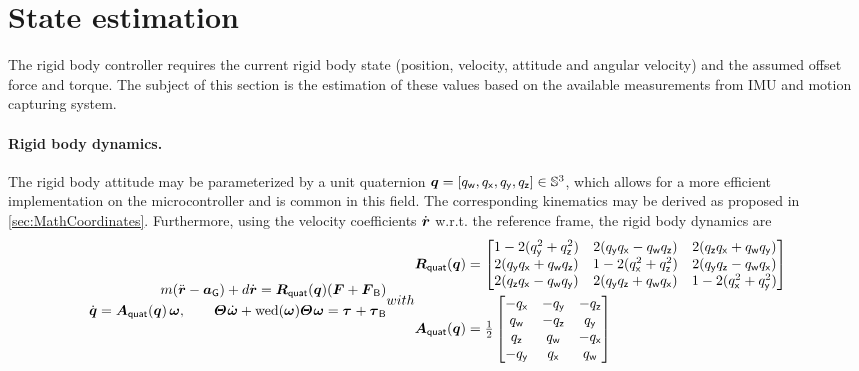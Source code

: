 \section{State estimation}\label{sec:RealizationStateEstimation}
The rigid body controller requires the current rigid body state (position, velocity, attitude and angular velocity) and the assumed offset force and torque.
The subject of this section is the estimation of these values based on the available measurements from IMU and motion capturing system.

\paragraph{Rigid body dynamics.}
The rigid body attitude may be parameterized by a unit quaternion $\boldsymbol{q} = [q_{\mathsf{w}}, q_{\mathsf{x}}, q_{\mathsf{y}}, q_{\mathsf{z}}] \in \mathbb{S}^3$, which allows for a more efficient implementation on the microcontroller and is common in this field.
The corresponding kinematics may be derived as proposed in \autoref{sec:MathCoordinates}.
Furthermore, using the velocity coefficients $\dot{\boldsymbol{r}}$ w.r.t. the reference frame, the rigid body dynamics are
\begin{subequations}\label{eq:RealizationStateDyn}
\begin{align}
 m (\rdd - \gravityAcc) + d \rd = \RotMatQuat(\quat) (\F + \FB)
\\
 \quatd = \kinMatQuat(\quat) \, \w, \qquad
 \bodyMOI{}{} \dot{\w} + \wedOp(\w) \bodyMOI{}{} \w = \bodyTorque{}{} + \tauB
\end{align}
with
\begin{align}
 \RotMatQuat(\quat) &=
 \begin{bmatrix} 
  1 - 2(\quaty^{2} + \quatz^{2}) & 2(\quaty\quatx -\quatw\quatz)  & 2(\quatz\quatx + \quatw\quaty) \\
  2(\quaty\quatx + \quatw\quatz) & 1 - 2(\quatx^{2} + \quatz^{2}) & 2(\quaty\quatz - \quatw\quatx) \\
  2(\quatz\quatx - \quatw\quaty) & 2(\quaty\quatz + \quatw\quatx) & 1 - 2(\quatx^{2} + \quaty^{2})
 \end{bmatrix}
\\
 \kinMatQuat(\quat) &=
 \tfrac{1}{2} \begin{bmatrix}
  -\quatx & -\quaty & -\quatz \\
  \quatw & -\quatz &  \quaty \\
  \quatz &  \quatw & -\quatx \\
  -\quaty &  \quatx &  \quatw
 \end{bmatrix}
\end{align}
\end{subequations}

